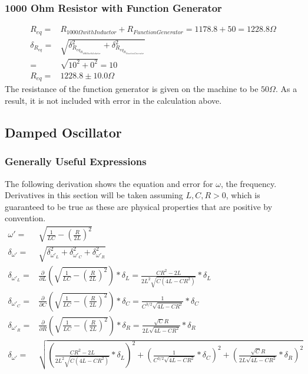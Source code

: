 \documentclass[12pt]{article}
\newcommand{\paren}[1]{\left( {#1} \right)}
\begin{document}
\subsubsection{1000 Ohm Resistor with Function Generator} \label{subsub:1000R_func}
\begin{align}
R_{eq}=&R_{1000\Omega with Inductor} + R_{Function Generator}=1178.8+50=1228.8\Omega \nonumber \\
\delta_{R_{eq}}=&\sqrt{\delta_{R_{{eq}_{R_{1000\Omega with Inductor}}}}^2+\delta_{R_{{eq}_{R_{Function Generator}}}}^2} \nonumber \\
=&\sqrt{10^2+0^2}=10 \nonumber \\
R_{eq}=&1228.8\pm10.0\Omega \label{eq:1000R_w_Inductor_and_Generator}
\end{align}
The resistance of the function generator is given on the machine to be $50\Omega$. As a result, it is not included with error in the calculation above.

\clearpage
\subsection{Damped Oscillator} \label{sec:Damped_Osillator}
\subsubsection{Generally Useful Expressions}
The following derivation shows the equation and error for $\omega$, the frequency. Derivatives in this section will be taken assuming $L, C, R>0$, which is guaranteed to be true as these are physical properties that are positive by convention.
\begin{align}
	\omega'=&\sqrt{\frac{1}{LC}-\paren{\frac{R}{2L}}^2} \label{eq:omega_prime} \\
	\delta_{\omega'}=&\sqrt{\delta_{\omega'_{L}}^2+\delta_{\omega'_{C}}^2+\delta_{\omega'_{R}}^2}  \label{eq:omega_prime_error} \\
	\delta_{\omega'_{L}}=& \frac{\partial}{\partial L}\paren{\sqrt{\frac{1}{LC}-\paren{\frac{R}{2L}}^2}}*\delta_L=\frac{CR^2-2L}{2L^2\sqrt{C(4L-CR^2)}}*\delta_L \nonumber \\
	\delta_{\omega'_{C}}=& \frac{\partial}{\partial C}\paren{\sqrt{\frac{1}{LC}-\paren{\frac{R}{2L}}^2}}*\delta_C=\frac{1}{C^{3/2}\sqrt{4L-CR^2}}*\delta_C \nonumber \\
	\delta_{\omega'_{R}}=& \frac{\partial}{\partial R}\paren{\sqrt{\frac{1}{LC}-\paren{\frac{R}{2L}}^2}}*\delta_R=\frac{\sqrt{C}R}{2L\sqrt{4L-CR^2}}*\delta_R \nonumber \\
	\delta_{\omega'}=&\sqrt{\paren{\frac{CR^2-2L}{2L^2\sqrt{C(4L-CR^2)}}*\delta_L}^2+\paren{\frac{1}{C^{3/2}\sqrt{4L-CR^2}}*\delta_C}^2+\paren{\frac{\sqrt{C}R}{2L\sqrt{4L-CR^2}}*\delta_R}^2} \label{eq:omega_prime_error_fullexpr}
\end{align}
\end{document}
